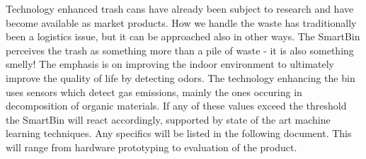 Technology enhanced trash cans have already been subject to research and have become available as market products.
How we handle the waste has traditionally been a logistics issue, but it can be approached also in other ways. The SmartBin perceives the trash as something more than a pile of waste - it is also something smelly!
The emphasis is on improving the indoor environment to ultimately improve the quality of life by detecting odors.
The technology enhancing the bin uses sensors which detect gas emissions, mainly the ones occuring in decomposition of organic materials.
If any of these values exceed the threshold the SmartBin will react accordingly, supported by state of the art machine learning techniques.
Any specifics will be listed in the following document. This will range from hardware prototyping to evaluation of the product.